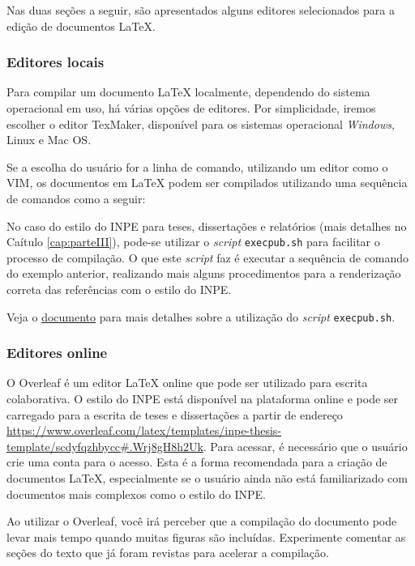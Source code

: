 Nas duas seções a seguir, são apresentados alguns editores selecionados para a edição de documentos \LaTeX{}.

\subsubsection*{Editores locais}
\label{sec:ed_local}

Para compilar um documento \LaTeX{} localmente, dependendo do sistema operacional em uso, há várias opções de editores. Por simplicidade, iremos escolher o editor TexMaker, disponível para os sistemas operacional \textit{Windows}, Linux e Mac OS.

Se a escolha do usuário for a linha de comando, utilizando um editor como o VIM, os documentos em \LaTeX{} podem ser compilados utilizando uma sequência de comandos como a seguir:

No caso do estilo do INPE para teses, dissertações e relatórios (mais detalhes no Caítulo \ref{cap:parteIII}), pode-se utilizar o \textit{script} {\tt execpub.sh} para facilitar o processo de compilação. O que este \textit{script} faz é executar a sequência de comando do exemplo anterior, realizando mais alguns procedimentos para a renderização correta das referências com o estilo do INPE. 

\begin{marker}
  Veja o \href{http://mtc-m16d.sid.inpe.br/col/sid.inpe.br/mtc-m19@80/2010/03.24.15.12/doc/ambiente_latex_no_linux.pdf}{documento} para mais detalhes sobre a utilização do \textit{script} {\tt execpub.sh}.
\end{marker}

\subsubsection*{Editores online}
\label{sec:ed_online}

O Overleaf é um editor \LaTeX{} online que pode ser utilizado para escrita colaborativa. O estilo do INPE está disponível na plataforma online e pode ser carregado para a escrita de teses e dissertações a partir de endereço \url{https://www.overleaf.com/latex/templates/inpe-thesis-template/scdyfqzhbycc#.Wrj8gH8h2Uk}. Para acessar, é necessário que o usuário crie uma conta para o acesso. Esta é a forma recomendada para a criação de documentos \LaTeX{}, especialmente se o usuário ainda não está familiarizado com documentos mais complexos como o estilo do INPE.

\begin{marker}
  Ao utilizar o Overleaf, você irá perceber que a compilação do documento pode levar mais tempo quando muitas figuras são incluídas. Experimente comentar as seções do texto que já foram revistas para acelerar a compilação.
\end{marker}

